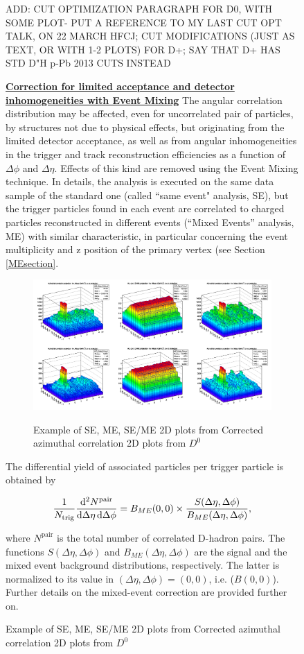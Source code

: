 \begin{enumerate}
\begin{figure}[h]
ADD: CUT OPTIMIZATION PARAGRAPH FOR D0, WITH SOME PLOT- PUT A REFERENCE TO MY LAST CUT OPT TALK, ON 22 MARCH HFCJ; CUT MODIFICATIONS (JUST AS TEXT, OR WITH 1-2 PLOTS) FOR D+; SAY THAT D+ HAS STD D"H p-Pb 2013 CUTS INSTEAD

\item
\underline {\bf Correction for limited acceptance and detector inhomogeneities with Event Mixing}
The angular correlation distribution may be affected, even for uncorrelated pair of particles, by structures not due to physical effects, but originating from the limited detector acceptance, as well as from angular inhomogeneities in the trigger and track reconstruction efficiencies as a function of $\Delta\phi$ and $\Delta\eta$.
Effects of this kind are removed using the Event Mixing technique.
In details, the analysis is executed on the same data sample of the standard one (called ``same event" analysis, SE), but the trigger particles found in each event are correlated to charged particles reconstructed in different events (``Mixed Events'' analysis, ME) with similar characteristic, in particular concerning the event multiplicity and z position of the primary vertex (see Section \ref{MEsection}. \\

\begin{figure}
\centering
{\includegraphics[width=.30\linewidth]{figures/Dzero/CorrSEandME_Dzero_Canvas_PtIntBins9to11_pool7_thr0.3to99.0.png}}

 \caption{Example of SE, ME, SE/ME 2D plots from Corrected azimuthal correlation 2D plots from ${D}^0$} 
\label{fig:DzeroME}
\end{figure}

The differential yield of associated particles per trigger particle is obtained by
\begin{linenomath}
  \begin{equation}
    \label{2pcorr_incl}
    \frac{1}{N_\text{trig}}\frac{\mathrm{d}^{2}N^\text{pair}}{\mathrm{d}\Delta\eta\, \mathrm{d}\Delta\phi}
= B_{ME}(0,0)\times\frac{S(\Delta\eta,\Delta\phi)}{B_{ME}(\Delta\eta,\Delta\phi)},
\end{equation}
\end{linenomath}
where $N^\text{pair}$ is the total number of correlated D-hadron
pairs. The functions $S(\Delta\eta,\Delta\phi)$ and
$B_{ME}(\Delta\eta,\Delta\phi)$ are the signal and the mixed event
background distributions, respectively. The latter is normalized to its value in
$(\Delta\eta,\Delta\phi)=(0,0)$, i.e. ($B(0,0)$).
Further details on the mixed-event correction are provided further on.


\end{figure}
\end{enumerate}
